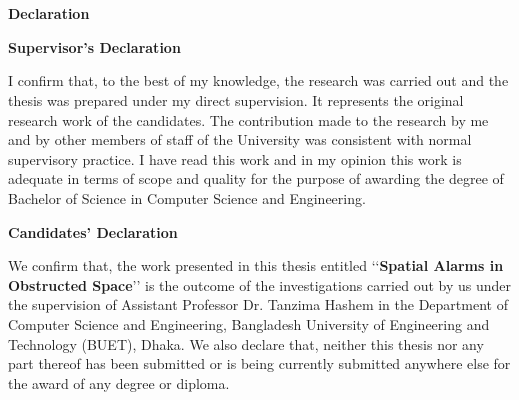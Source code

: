 
\chapter*{}
\vspace{-3cm}
\begin{center}
\vfill

\textbf{\Large {\bf Declaration}}

\vfill
\vfill

{\bf Supervisor's Declaration}
\end{center}
\vfill
\footnotesize{
I confirm that, to the best of my knowledge, the research was carried out and the thesis was prepared under my direct supervision. It represents the original research work of the candidates. The contribution made to the research by me and by other members of staff of the University was consistent with normal supervisory practice. I have read this work and in my opinion this work is adequate in terms of scope and quality for the purpose of awarding the degree of Bachelor of Science in Computer Science and Engineering.
\vfill
\vfill
\vspace{0.6cm}
}
\vspace{1.0cm}
\normalsize
\begin{center}
{\bf Candidates' Declaration}
\end{center}
\vfill
\footnotesize{
We confirm that, the work presented in this thesis entitled \lq\lq{}{\bf Spatial Alarms in Obstructed Space}\rq\rq{} is the outcome of the investigations carried out by us under the supervision of Assistant Professor Dr. Tanzima Hashem in the Department of Computer Science and Engineering, Bangladesh University of Engineering and Technology (BUET), Dhaka. We also declare that, neither this thesis nor any part thereof has been submitted or is being currently submitted anywhere else for the award of any degree or diploma.
\vspace{1.5cm}
}
\normalsize
\vfill
\endinput
